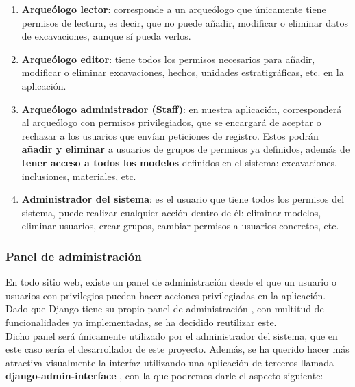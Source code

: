     \begin{enumerate}
        \item \textbf{Arqueólogo lector}: corresponde a un arqueólogo que únicamente tiene
        permisos de lectura, es decir, que no puede añadir, modificar o eliminar
        datos de excavaciones, aunque sí pueda verlos.

        \item \textbf{Arqueólogo editor}: tiene todos los permisos necesarios para añadir,
        modificar o eliminar excavaciones, hechos, unidades estratigráficas, etc. en la
        aplicación.

        \item \textbf{Arqueólogo administrador (Staff)}: en nuestra aplicación, corresponderá
        al arqueólogo con permisos privilegiados, que se encargará de aceptar o rechazar a
        los usuarios que envían peticiones de registro. Estos podrán \textbf{añadir y
        eliminar} a usuarios de grupos de permisos ya definidos, además de \textbf{tener
        acceso a todos los modelos} definidos en el sistema: excavaciones, inclusiones,
        materiales, etc.

        \item \textbf{Administrador del sistema}: es el usuario que tiene todos los permisos
        del sistema, puede realizar cualquier acción dentro de él: eliminar modelos, eliminar
        usuarios, crear grupos, cambiar permisos a usuarios concretos, etc.
    \end{enumerate}

\subsubsection{Panel de administración}
En todo sitio web, existe un panel de administración desde el que un usuario o usuarios
con privilegios pueden hacer acciones privilegiadas en la aplicación. Dado que Django
tiene su propio panel de administración \cite{admin-panel}, con multitud de funcionalidades
ya implementadas, se ha decidido reutilizar este.\\

Dicho panel será únicamente utilizado por el administrador del sistema, que en este caso
sería el desarrollador de este proyecto. Además, se ha querido hacer más atractiva
visualmente la interfaz utilizando una aplicación de terceros llamada
\textbf{django-admin-interface} \cite{admin-interface}, con la que podremos darle el
aspecto siguiente:

